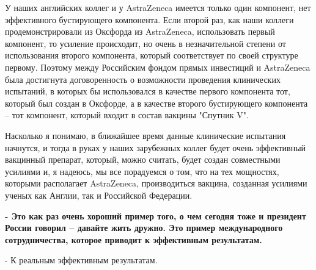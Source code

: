 У наших английских коллег и у AstraZeneca имеется только один компонент, нет
эффективного бустирующего компонента. Если второй раз, как наши коллеги
продемонстрировали из Оксфорда из AstraZeneca, использовать первый компонент,
то усиление происходит, но очень в незначительной степени от использования
второго компонента, который соответствует по своей структуре первому. Поэтому
между Российским фондом прямых инвестиций и AstraZeneca была достигнута
договоренность о возможности проведения клинических испытаний, в которых бы
использовался в качестве первого компонента тот, который был создан в Оксфорде,
а в качестве второго бустирующего компонента – тот компонент, который входит в
состав вакцины "Спутник V".

Насколько я понимаю, в ближайшее время данные клинические испытания начнутся, и
тогда в руках у наших зарубежных коллег будет очень эффективный вакцинный
препарат, который, можно считать, будет создан совместными усилиями и, я
надеюсь, мы все порадуемся о том, что на тех мощностях, которыми располагает
AstraZeneca, производиться вакцина, созданная усилиями ученых как Англии, так и
Российской Федерации.

\textbf{- Это как раз очень хороший пример того, о чем сегодня тоже и президент России
говорил – давайте жить дружно. Это пример международного сотрудничества,
которое приводит к эффективным результатам.}

- К реальным эффективным результатам.
